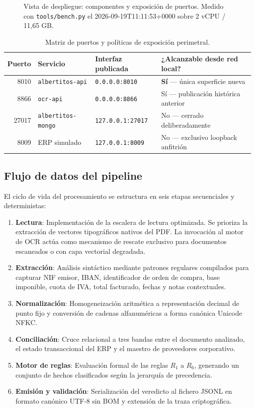 \documentclass[11pt,a4paper]{article}
\begin{document}
\begin{figure}[htbp]
{\begin{tikzpicture}
\end{tikzpicture}%
}
\caption{Vista de despliegue: componentes y exposición de puertos. Medido con \texttt{tools/bench.py} el 2026-09-19T11:11:53+0000 sobre 2 vCPU / 11,65 GB.}
\end{figure}

\begin{table}[htbp]
\centering
\begin{tabular}{r l l l}
\toprule
\textbf{Puerto} & \textbf{Servicio} & \textbf{Interfaz publicada} & \textbf{¿Alcanzable desde red local?} \\
\midrule
8010 & \texttt{albertitos-api} & \texttt{0.0.0.0:8010} & \textbf{Sí} --- única superficie nueva \\
8866 & \texttt{ocr-api} & \texttt{0.0.0.0:8866} & Sí --- publicación histórica anterior \\
27017 & \texttt{albertitos-mongo} & \texttt{127.0.0.1:27017} & No --- cerrado deliberadamente \\
8009 & ERP simulado & \texttt{127.0.0.1:8009} & No --- exclusivo loopback anfitrión \\
\bottomrule
\end{tabular}
\caption{Matriz de puertos y políticas de exposición perimetral.}
\end{table}

\subsection{Flujo de datos del pipeline}
El ciclo de vida del procesamiento se estructura en seis etapas secuenciales y deterministas:
\begin{enumerate}[label=\textbf{\arabic*.}]
    \item \textbf{Lectura}: Implementación de la escalera de lectura optimizada. Se prioriza la extracción de vectores tipográficos nativos del PDF. La invocación al motor de OCR actúa como mecanismo de rescate exclusivo para documentos escaneados o con capa vectorial degradada.
    \item \textbf{Extracción}: Análisis sintáctico mediante patrones regulares compilados para capturar NIF emisor, IBAN, identificador de orden de compra, base imponible, cuota de IVA, total facturado, fechas y notas contextuales.
    \item \textbf{Normalización}: Homogeneización aritmética a representación decimal de punto fijo y conversión de cadenas alfanuméricas a forma canónica Unicode NFKC.
    \item \textbf{Conciliación}: Cruce relacional a tres bandas entre el documento analizado, el estado transaccional del ERP y el maestro de proveedores corporativo.
    \item \textbf{Motor de reglas}: Evaluación formal de las reglas $R_1$ a $R_6$, generando un conjunto de hechos clasificados según la jerarquía de precedencia.
    \item \textbf{Emisión y validación}: Serialización del veredicto al fichero JSONL en formato canónico UTF-8 sin BOM y extensión de la traza criptográfica.
\end{enumerate}
\end{document}
